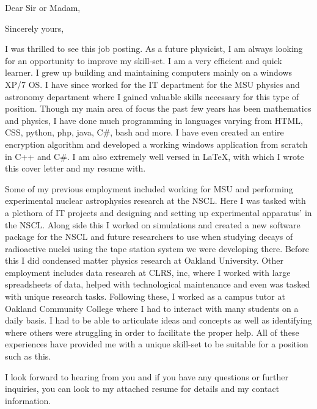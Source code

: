 \documentclass[11pt,a4paper,sans]{moderncv} %
\begin{document}
\makecvtitle 



\date{\today} %
\opening{Dear Sir or Madam,} %

\closing{Sincerely yours,} %

\makelettertitle %

\hspace{1cm} I was thrilled to see this job posting. As a future physicist, I am always looking for an opportunity to improve my skill-set. I am a very efficient and quick learner. I grew up building and maintaining computers mainly on a windows XP/7 OS. I have since worked for the IT department for the MSU physics and astronomy department where I gained valuable skills necessary for this type of position. Though my main area of focus the past few years has been mathematics and physics, I have done much programming in languages varying from HTML, CSS, python, php, java, C\#, bash and more. I have even created an entire encryption algorithm and developed a working windows application from scratch in C++ and C\#. I am also extremely well versed in \LaTeX, with which I wrote this cover letter and my resume with.

\hspace{1cm} Some of my previous employment included working for MSU and performing experimental nuclear astrophysics research at the NSCL. Here I was tasked with a plethora of IT projects and designing and setting up experimental apparatus' in the NSCL. Along side this I worked on simulations and created a new software package for the NSCL and future researchers to use when studying decays of radioactive nuclei using the tape station system we were developing there. Before this I did condensed matter physics research at Oakland University. Other employment includes data research at CLRS, inc, where I worked with large spreadsheets of data, helped with technological maintenance and even was tasked with unique research tasks. Following these, I worked as a campus tutor at Oakland Community College where I had to interact with many students on a daily basis. I had to be able to articulate ideas and concepts as well as identifying where others were struggling in order to facilitate the proper help. All of these experiences have provided me with a unique skill-set to be suitable for a position such as this.

\hspace{1cm} I look forward to hearing from you and if you have any questions or further inquiries, you can look to my attached resume for details and my contact information.

\makeletterclosing %

\end{document}
